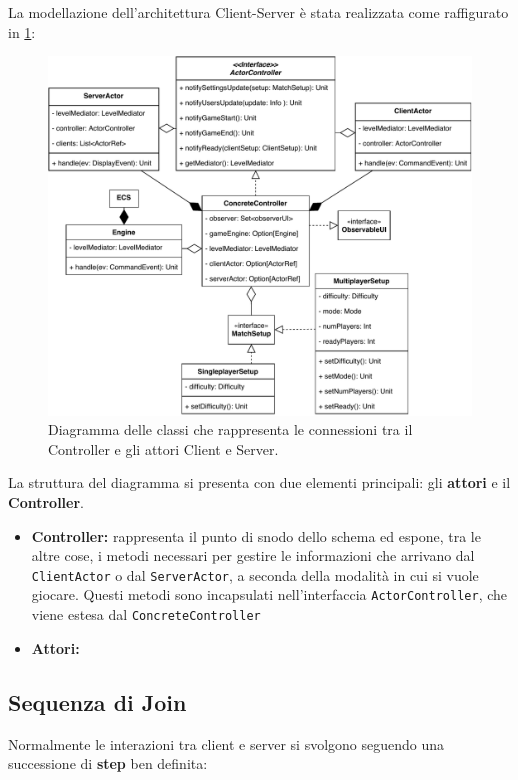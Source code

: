La modellazione dell'architettura Client-Server è stata realizzata come raffigurato in \ref{fig:Controller-Actors-Interaction}:
\begin{figure}[H]
	\centering
	\includegraphics[width=0.99\columnwidth]{drawio/client-server/Controller-Actors-Interaction.pdf}
	\caption{Diagramma delle classi che rappresenta le connessioni tra il Controller e gli attori Client e Server.}
	\label{fig:Controller-Actors-Interaction}
\end{figure}
La struttura del diagramma si presenta con due elementi principali: gli \textbf{attori} e il \textbf{Controller}.
\begin{itemize}
    \item \textbf{Controller:} rappresenta il punto di snodo dello schema ed espone, tra le altre cose, i metodi necessari per gestire le informazioni che arrivano dal \texttt{ClientActor} o dal \texttt{ServerActor}, a seconda della modalità in cui si vuole giocare. Questi metodi sono incapsulati nell'interfaccia \texttt{ActorController}, che viene estesa dal \texttt{ConcreteController}
    \item \textbf{Attori:}
\end{itemize}

\subsection{Sequenza di Join}

Normalmente le interazioni tra client e server si svolgono seguendo una successione di \textbf{step} ben definita:

